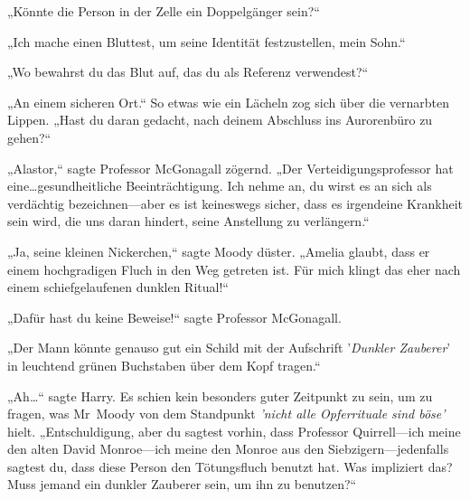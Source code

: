 „Könnte die Person in der Zelle ein Doppelgänger sein?“

„Ich mache einen Bluttest, um seine Identität festzustellen, mein Sohn.“

„Wo bewahrst du das Blut auf, das du als Referenz verwendest?“

„An einem sicheren Ort.“ So etwas wie ein Lächeln zog sich über die vernarbten Lippen. „Hast du daran gedacht, nach deinem Abschluss ins Aurorenbüro zu gehen?“

„Alastor,“ sagte Professor McGonagall zögernd. „Der Verteidigungsprofessor hat eine…gesundheitliche Beeinträchtigung. Ich nehme an, du wirst es an sich als verdächtig bezeichnen—aber es ist keineswegs sicher, dass es irgendeine Krankheit sein wird, die uns daran hindert, seine Anstellung zu verlängern.“

„Ja, seine kleinen Nickerchen,“ sagte Moody düster. „Amelia glaubt, dass er einem hochgradigen Fluch in den Weg getreten ist. Für mich klingt das eher nach einem schiefgelaufenen dunklen Ritual!“

„Dafür hast du keine Beweise!“ sagte Professor McGonagall.

„Der Mann könnte genauso gut ein Schild mit der Aufschrift '\emph{Dunkler Zauberer}' in leuchtend grünen Buchstaben über dem Kopf tragen.“

„Ah…“ sagte Harry. Es schien kein besonders guter Zeitpunkt zu sein, um zu fragen, was Mr~Moody von dem Standpunkt \emph{'nicht alle Opferrituale sind böse'} hielt. „Entschuldigung, aber du sagtest vorhin, dass Professor Quirrell—ich meine den alten David Monroe—ich meine den Monroe aus den Siebzigern—jedenfalls sagtest du, dass diese Person den Tötungsfluch benutzt hat. Was impliziert das? Muss jemand ein dunkler Zauberer sein, um ihn zu benutzen?“

